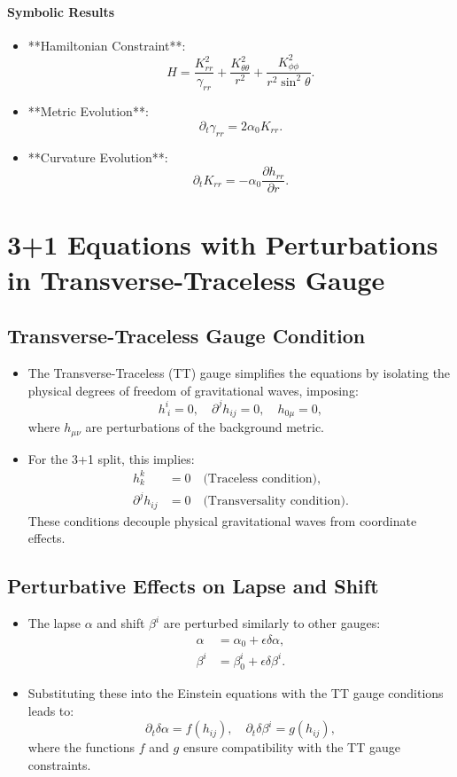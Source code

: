 \documentclass[12pt]{article}
\begin{document}
\paragraph{Symbolic Results}
\begin{itemize}
    \item **Hamiltonian Constraint**:
    \[
    H = \frac{K_{rr}^2}{\gamma_{rr}} + \frac{K_{\theta\theta}^2}{r^2} + \frac{K_{\phi\phi}^2}{r^2 \sin^2\theta}.
    \]
    \item **Metric Evolution**:
    \[
    \partial_t \gamma_{rr} = 2\alpha_0 K_{rr}.
    \]
    \item **Curvature Evolution**:
    \[
    \partial_t K_{rr} = -\alpha_0 \frac{\partial h_{rr}}{\partial r}.
    \]
\end{itemize}

\section{3+1 Equations with Perturbations in Transverse-Traceless Gauge}

\subsection{Transverse-Traceless Gauge Condition}
\begin{itemize}
    \item The Transverse-Traceless (TT) gauge simplifies the equations by isolating the physical degrees of freedom of gravitational waves, imposing:
    \[
    h^i_{\ i} = 0, \quad \partial^j h_{ij} = 0, \quad h_{0\mu} = 0,
    \]
    where $h_{\mu\nu}$ are perturbations of the background metric.
    \item For the 3+1 split, this implies:
    \begin{align*}
        h^k_k &= 0 \quad \text{(Traceless condition)}, \\
        \partial^j h_{ij} &= 0 \quad \text{(Transversality condition)}.
    \end{align*}
    These conditions decouple physical gravitational waves from coordinate effects.
\end{itemize}

\subsection{Perturbative Effects on Lapse and Shift}
\begin{itemize}
    \item The lapse $\alpha$ and shift $\beta^i$ are perturbed similarly to other gauges:
    \begin{align*}
        \alpha &= \alpha_0 + \epsilon \delta\alpha, \\
        \beta^i &= \beta_0^i + \epsilon \delta\beta^i.
    \end{align*}
    \item Substituting these into the Einstein equations with the TT gauge conditions leads to:
    \[
    \partial_t \delta\alpha = f(h_{ij}), \quad \partial_t \delta\beta^i = g(h_{ij}),
    \]
    where the functions \(f\) and \(g\) ensure compatibility with the TT gauge constraints.
\end{itemize}
\end{document}
